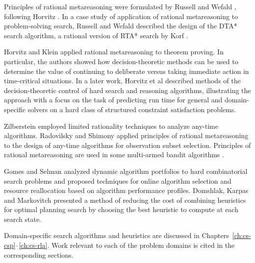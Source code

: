Principles of rational metareasoning were formulated by Russell
and Wefald \cite{Russell.right}, following Horvitz
\cite{Horvitz.reasoningabout}. In a case study of application of rational
metareasoning to problem-solving search, Russell and Wefald
\cite{Russell.right} described the design of the DTA* search algorithm,
a rational version of RTA* search by Korf \cite{Korf.rta}. 

Horvitz and Klein \cite{Horvitz.proving} applied rational
metareasoning to theorem proving. In particular, the authors showed how
decision-theoretic methods can be used to determine the value of
continuing to deliberate versus taking immediate action in
time-critical situations. In a later work, Horvitz et al
\cite{Horvitz.bayesian} described methods of the
decision-theoretic control of hard search and
reasoning algorithms, illustrating the approach with a focus on the
task of predicting run time for general and domain-specific solvers on
a hard class of structured constraint satisfaction problems. 

Zilberstein \cite{Zilberstein.PHD} employed limited rationality
techniques to analyze any-time algorithms. Radovilsky and Shimony
\cite{Radovilsky.oss} applied principles of rational metareasoning to
the design of any-time algorithms for observation subset
selection. Principles of rational metareasoning are used in some
multi-armed bandit algorithms \cite{Vermorel.bandits}.

Gomes and Selman \cite{Gomes.portfolio} analyzed dynamic algorithm
portfolios to hard combinatorial search problems and proposed
techniques for online algorithm selection and resource reallocation
based on algorithm performance profiles. Domshlak, Karpas and
Markovitch \cite{Domshlak.maxornot} presented a method of reducing the
cost of combining heuristics for optimal planning search by choosing
the best heuristic to compute at each search state.

Domain-specific search algorithms and heuristics are discussed in 
Chapters~\ref{ch:cs-csp}--\ref{ch:cs-rla}. Work relevant to each of
the problem domains is cited in the corresponding sections. 
